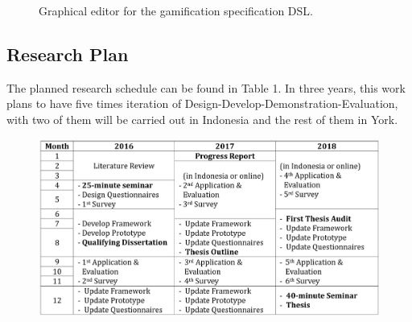 \documentclass[12pt, a4paper]{report}
\begin{document}
{\begin{figure}[ht]
\centering
{}
\caption{Graphical editor for the gamification specification DSL.}
\label{fig:002}
\end{figure}




\begin{appendices}

\chapter{Research Plan}
\label{Research Plan}
The planned research schedule can be found in Table 1. In three years, this work plans to have five times iteration of Design-Develop-Demonstration-Evaluation, with two of them will be carried out in Indonesia and the rest of them in York.



\begin {table}[ht]
\caption {Research Timetable} 
\end{table}
\begin{figure}[ht]
\centering
\includegraphics[width=\textwidth]{timetable}
\end{figure}


\end{appendices}}
\end{document}
